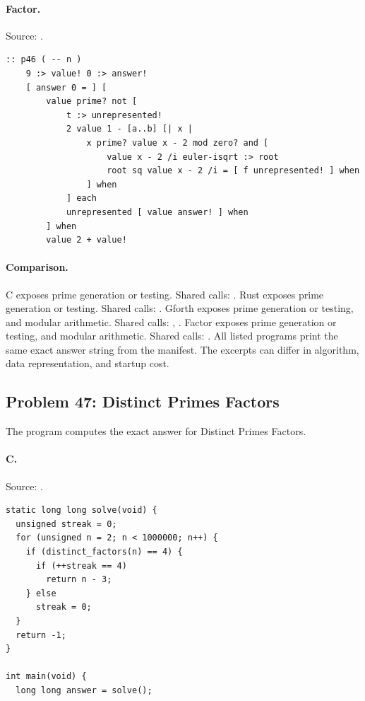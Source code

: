 \paragraph{Factor.} Source: .
\begin{lstlisting}
:: p46 ( -- n )
    9 :> value! 0 :> answer!
    [ answer 0 = ] [
        value prime? not [
            t :> unrepresented!
            2 value 1 - [a..b] [| x |
                x prime? value x - 2 mod zero? and [
                    value x - 2 /i euler-isqrt :> root
                    root sq value x - 2 /i = [ f unrepresented! ] when
                ] when
            ] each
            unrepresented [ value answer! ] when
        ] when
        value 2 + value!
\end{lstlisting}

\paragraph{Comparison.}
C exposes prime generation or testing. Shared calls: \texttt{}. Rust exposes prime generation or testing. Shared calls: \texttt{}. Gforth exposes prime generation or testing, and modular arithmetic. Shared calls: \texttt{}, \texttt{}. Factor exposes prime generation or testing, and modular arithmetic. Shared calls: \texttt{}.
All listed programs print the same exact answer string from the manifest. The excerpts can differ in algorithm, data representation, and startup cost.

\subsection{Problem 47: Distinct Primes Factors}
\label{walkthrough:p47}
The program computes the exact answer for Distinct Primes Factors.

\paragraph{C.} Source: .
\begin{lstlisting}
static long long solve(void) {
  unsigned streak = 0;
  for (unsigned n = 2; n < 1000000; n++) {
    if (distinct_factors(n) == 4) {
      if (++streak == 4)
        return n - 3;
    } else
      streak = 0;
  }
  return -1;
}

int main(void) {
  long long answer = solve();
\end{lstlisting}

